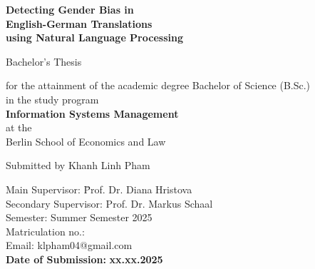 \thispagestyle{empty}

\begin{center}

\vspace*{-10mm}

{\Large \textbf{Detecting Gender Bias in}}\\ 
\vspace*{2mm}
{\Large \textbf{English-German Translations}}\\ 
\vspace*{2mm}
{\Large \textbf{using Natural Language Processing}}\\

\vspace*{\fill} 

{\LARGE {Bachelor's Thesis}}\\ 

\vspace*{\fill} 

for the attainment of the academic degree Bachelor of Science (B.Sc.)\\ \vspace*{1.5mm} 
in the study program\\\vspace*{1.5mm}
\textbf{Information Systems Management}\\\vspace*{1.5mm}
at the\\\vspace*{1.5mm}
Berlin School of Economics and Law\\

\vspace*{\fill} 

{\Large Submitted by Khanh Linh Pham}\\[15mm]

\vspace*{\fill} 

\begin{flushleft}
\begin{tabbing}
Main Supervisor:\hspace{1.6cm} \= Prof. Dr. Diana Hristova \\
Secondary Supervisor:\> Prof. Dr. Markus Schaal \\[4mm]
Semester:\> Summer Semester 2025\\
Matriculation no.:\\
Email:\> klpham04@gmail.com\\[8mm]
\textbf{Date of Submission:} \> \textbf{xx.xx.2025}\\
\end{tabbing}
\end{flushleft}

\end{center}

\clearpage{\pagestyle{empty}\cleardoublepage}